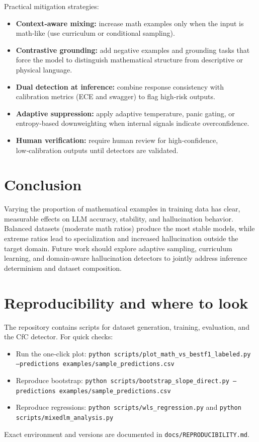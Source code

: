 \documentclass[11pt,a4paper]{article}
\begin{document}
Practical mitigation strategies:
\begin{itemize}[noitemsep]
  \item \textbf{Context‑aware mixing:} increase math examples only when the input is math‑like (use curriculum or conditional sampling).
  \item \textbf{Contrastive grounding:} add negative examples and grounding tasks that force the model to distinguish mathematical structure from descriptive or physical language.
  \item \textbf{Dual detection at inference:} combine response consistency with calibration metrics (ECE and swagger) to flag high‑risk outputs.
  \item \textbf{Adaptive suppression:} apply adaptive temperature, panic gating, or entropy‑based downweighting when internal signals indicate overconfidence.
  \item \textbf{Human verification:} require human review for high‑confidence, low‑calibration outputs until detectors are validated.
\end{itemize}

\section{Conclusion}
Varying the proportion of mathematical examples in training data has clear, measurable effects on LLM accuracy, stability, and hallucination behavior. Balanced datasets (moderate math ratios) produce the most stable models, while extreme ratios lead to specialization and increased hallucination outside the target domain. Future work should explore adaptive sampling, curriculum learning, and domain‑aware hallucination detectors to jointly address inference determinism and dataset composition.

\section*{Reproducibility and where to look}
The repository contains scripts for dataset generation, training, evaluation, and the CfC detector. For quick checks:
\begin{itemize}[noitemsep]
  \item Run the one‑click plot: \texttt{python scripts/plot\_math\_vs\_bestf1\_labeled.py --predictions examples/sample\_predictions.csv}
  \item Reproduce bootstrap: \texttt{python scripts/bootstrap\_slope\_direct.py --predictions examples/sample\_predictions.csv}
  \item Reproduce regressions: \texttt{python scripts/wls\_regression.py} and \texttt{python scripts/mixedlm\_analysis.py}
\end{itemize}
Exact environment and versions are documented in \texttt{docs/REPRODUCIBILITY.md}.
\end{document}
